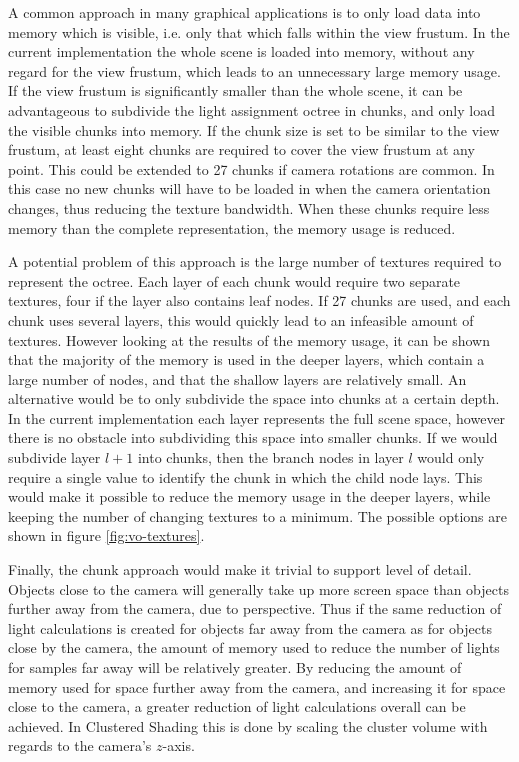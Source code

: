 

A common approach in many graphical applications is to only load data into memory which
is visible, i.e. only that which falls within the view frustum. In the current implementation
the whole scene is loaded into memory, without any regard for the view frustum, which leads
to an unnecessary large memory usage. If the view frustum is significantly smaller than the
whole scene, it can be advantageous to subdivide the light assignment octree in chunks, and
only load the visible chunks into memory. If the chunk size is set to be similar to the view
frustum, at least eight chunks are required to cover the view frustum at any point.
This could be extended to 27 chunks if camera rotations are common. In this case no new chunks
will have to be loaded in when the camera orientation changes, thus reducing the texture
bandwidth. When these chunks require less memory than the complete representation, the memory
usage is reduced.

A potential problem of this approach is the large number of textures required to represent
the octree. Each layer of each chunk would require two separate textures, four if the layer
also contains leaf nodes. If 27 chunks are used, and each chunk uses several layers, this
would quickly lead to an infeasible amount of textures. However looking at the results of
the memory usage, it can be shown that the majority of the memory is used in the deeper
layers, which contain a large number of nodes, and that the shallow layers are relatively
small. An alternative would be to only subdivide the space into chunks at a certain depth.
In the current implementation each layer represents the full scene space, however there is
no obstacle into subdividing this space into smaller chunks. If we would subdivide layer $l + 1$
into chunks, then the branch nodes in layer $l$ would only require a single value to identify
the chunk in which the child node lays. This would make it possible to reduce the memory usage
in the deeper layers, while keeping the number of changing textures to a minimum.
The possible options are shown in figure \ref{fig:vo-textures}.

Finally, the chunk approach would make it trivial to support level of detail. Objects close
to the camera will generally take up more screen space than objects further away from the camera,
due to perspective. Thus if the same reduction of light calculations is created for objects
far away from the camera as for objects close by the camera, the amount of memory used to reduce
the number of lights for samples far away will be relatively greater. By reducing the amount of
memory used for space further away from the camera, and increasing it for space close to the
camera, a greater reduction of light calculations overall can be achieved. In Clustered
Shading this is done by scaling the cluster volume with regards to the camera's $z$-axis.

